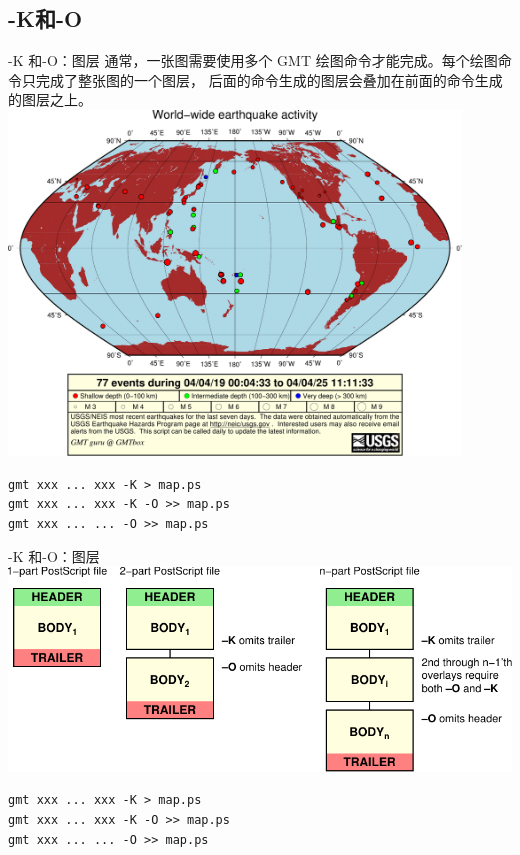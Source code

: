 \documentclass[UTF8, 11pt]{ctexbeamer}
\begin{document}
\subsection{-K和-O}
\begin{frame}[fragile]{-K 和-O：图层}
通常，一张图需要使用多个 GMT 绘图命令才能完成。每个绘图命令只完成了整张图的一个图层，
后面的命令生成的图层会叠加在前面的命令生成的图层之上。
\centering
\includegraphics[width=0.9\textwidth]{GMT_geo_global}
\begin{verbatim}
gmt xxx ... xxx -K > map.ps
gmt xxx ... xxx -K -O >> map.ps
gmt xxx ... ... -O >> map.ps
\end{verbatim}
\end{frame}
\begin{frame}[fragile]{-K 和-O：图层}
\includegraphics[width=\textwidth]{GMT_-OK}
\begin{verbatim}
gmt xxx ... xxx -K > map.ps
gmt xxx ... xxx -K -O >> map.ps
gmt xxx ... ... -O >> map.ps
\end{verbatim}
\end{frame}
\end{document}
